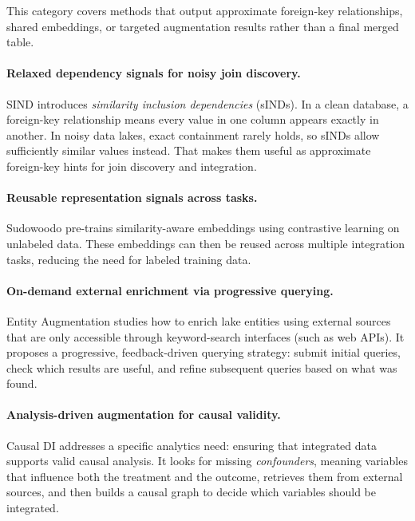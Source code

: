 \documentclass[sigconf]{acmart}
\begin{document}
This category covers methods that output approximate foreign-key relationships, shared embeddings, or targeted augmentation results rather than a final merged table.

\paragraph{Relaxed dependency signals for noisy join discovery.}
SIND introduces \emph{similarity inclusion dependencies} (sINDs). In a clean database, a foreign-key relationship means every value in one column appears exactly in another. In noisy data lakes, exact containment rarely holds, so sINDs allow sufficiently similar values instead. That makes them useful as approximate foreign-key hints for join discovery and integration.

\paragraph{Reusable representation signals across tasks.}
Sudowoodo pre-trains similarity-aware embeddings using contrastive learning on unlabeled data. These embeddings can then be reused across multiple integration tasks, reducing the need for labeled training data.

\paragraph{On-demand external enrichment via progressive querying.}
Entity Augmentation studies how to enrich lake entities using external sources that are only accessible through keyword-search interfaces (such as web APIs). It proposes a progressive, feedback-driven querying strategy: submit initial queries, check which results are useful, and refine subsequent queries based on what was found.

\paragraph{Analysis-driven augmentation for causal validity.}
Causal DI addresses a specific analytics need: ensuring that integrated data supports valid causal analysis. It looks for missing \emph{confounders}, meaning variables that influence both the treatment and the outcome, retrieves them from external sources, and then builds a causal graph to decide which variables should be integrated.


\label{sec:pubs-by-phase}


\end{document}

